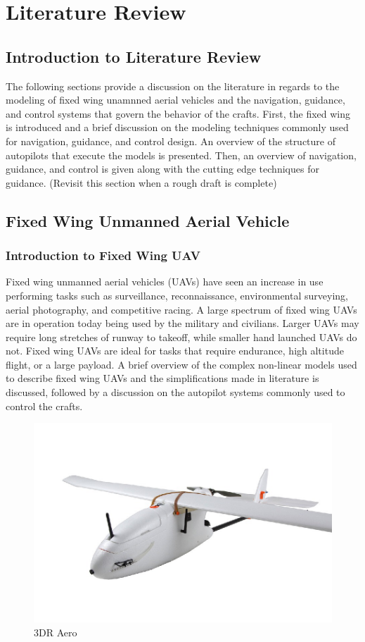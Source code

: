 \documentclass[numbered,pdftex]{ohio-etd}
\begin{document}
\chapter{Literature Review}
\section{Introduction to Literature Review}
The following sections provide a discussion on the literature in regards to the modeling of fixed wing unamnned aerial vehicles and the navigation, guidance, and control systems that govern the behavior of the crafts. First, the fixed wing is introduced and a brief discussion on the modeling techniques commonly used for navigation, guidance, and control design. An overview of the structure of autopilots that execute the models is presented. Then, an overview of navigation, guidance, and control is given along with the cutting edge techniques for guidance. (Revisit this section when a rough draft is complete)


\section{Fixed Wing Unmanned Aerial Vehicle}
\subsection{Introduction to Fixed Wing UAV}
Fixed wing unmanned aerial vehicles (UAVs) have seen an increase in use performing tasks such as surveillance, reconnaissance, environmental surveying, aerial photography, and competitive racing. A large spectrum of fixed wing UAVs are in operation today being used by the military and civilians. Larger UAVs may require long stretches of runway to takeoff, while smaller hand launched UAVs do not. Fixed wing UAVs are ideal for tasks that require endurance, high altitude flight, or a large payload. A brief overview of the complex non-linear models used to describe fixed wing UAVs and the simplifications made in literature is discussed, followed by a discussion on the autopilot systems commonly used to control the crafts.

%
%
%
%
\begin{figure}[h]
	\centering
	\includegraphics[width=0.7\linewidth]{PaperFigures/fixedwing}
	\caption{3DR Aero}
	\label{fig:fixedwing}
\end{figure}
\end{document}
